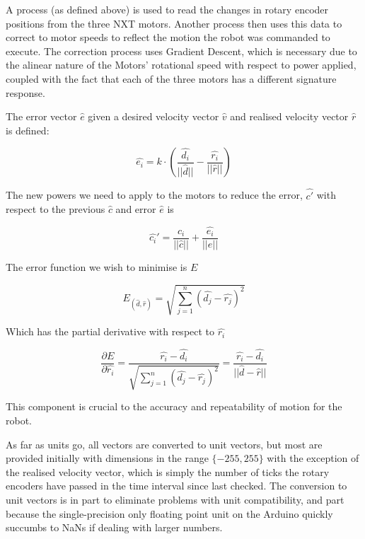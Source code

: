 A process (as defined above) is used to read the changes in rotary encoder positions from the three NXT motors. Another process then uses this data to correct to motor speeds to reflect the motion the robot was commanded to execute. The correction process uses Gradient Descent, which is necessary due to the alinear nature of the Motors' rotational speed with respect to power applied, coupled with the fact that each of the three motors has a different signature response.

The error vector $\hat{e}$ given a desired velocity vector $\hat{v}$ and realised velocity vector $\hat{r}$ is defined:

\begin{equation}
  \hat{e_i} = k \cdot (\frac{\hat{d_i}}{||\hat{d}||} - \frac{\hat{r_i}}{||\hat{r}||})
\end{equation}

The new powers we need to apply to the motors to reduce the error, $\hat{c'}$ with respect to the previous $\hat{c}$ and error $\hat{e}$ is

\begin{equation}
  \hat{c_i}' = \frac{ \hat{c_i} }{||\hat{c}||} + \frac{ \hat{e_i} }{||\hat{e}||}
\end{equation}

The error function we wish to minimise is $E$

\begin{equation}
  E_{(\hat{d},\hat{r})} = \sqrt{\sum_{j=1}^{n} (\hat{d_j} - \hat{r_j})^2}
\end{equation}

Which has the partial derivative with respect to $\hat{r_i}$

\begin{equation}
  \frac{\partial E}{\partial \hat{r_i}}
  =
  \frac{\hat{r_i} - \hat{d_i}}{\sqrt{\sum_{j=1}^{n} (\hat{d_j} - \hat{r_j})^2}}
  =
  \frac{\hat{r_i} - \hat{d_i}}{||\hat{d}-\hat{r}||}
\end{equation}

This component is crucial to the accuracy and repeatability of motion for the robot.

As far as units go, all vectors are converted to unit vectors, but most are provided initially with dimensions in the range ${\{-255,255\}}$ with the exception of the realised velocity vector, which is simply the number of ticks the rotary encoders have passed in the time interval since last checked. The conversion to unit vectors is in part to eliminate problems with unit compatibility, and part because the single-precision only floating point unit on the Arduino quickly succumbs to NaNs if dealing with larger numbers. 

